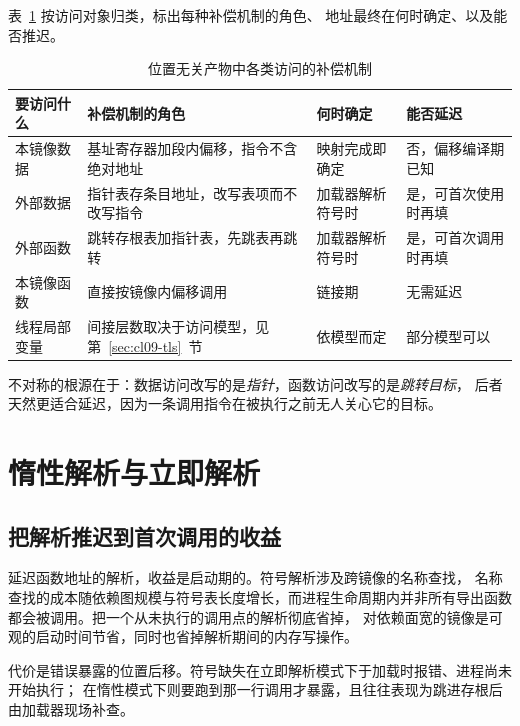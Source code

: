\documentclass[12pt,a4paper,fontset=fandol]{ctexbook}
\begin{document}
表~\ref{tab:cl09-trampoline} 按访问对象归类，标出每种补偿机制的角色、
地址最终在何时确定、以及能否推迟。

\begin{table}
  \centering
  \caption{位置无关产物中各类访问的补偿机制}
  \label{tab:cl09-trampoline}
  \begin{tabular}{>{\raggedright\arraybackslash}p{} >{\raggedright\arraybackslash}p{} >{\raggedright\arraybackslash}p{} >{\raggedright\arraybackslash}p{}}
    \toprule
    要访问什么 & 补偿机制的角色 & 何时确定 & 能否延迟 \\
    \midrule
    本镜像数据 & 基址寄存器加段内偏移，指令不含绝对地址 & 映射完成即确定 & 否，偏移编译期已知 \\
    外部数据 & 指针表存条目地址，改写表项而不改写指令 & 加载器解析符号时 & 是，可首次使用时再填 \\
    外部函数 & 跳转存根表加指针表，先跳表再跳转 & 加载器解析符号时 & 是，可首次调用时再填 \\
    本镜像函数 & 直接按镜像内偏移调用 & 链接期 & 无需延迟 \\
    线程局部变量 & 间接层数取决于访问模型，见第~\ref{sec:cl09-tls}~节 & 依模型而定 & 部分模型可以 \\
    \bottomrule
  \end{tabular}
\end{table}

不对称的根源在于：数据访问改写的是\emph{指针}，函数访问改写的是\emph{跳转目标}，
后者天然更适合延迟，因为一条调用指令在被执行之前无人关心它的目标。

\section{惰性解析与立即解析}\label{sec:cl09-lazy}

\subsection{把解析推迟到首次调用的收益}

延迟函数地址的解析，收益是启动期的。符号解析涉及跨镜像的名称查找，
名称查找的成本随依赖图规模与符号表长度增长，而进程生命周期内并非所有导出函数
都会被调用。把一个从未执行的调用点的解析彻底省掉，
对依赖面宽的镜像是可观的启动时间节省，同时也省掉解析期间的内存写操作。

代价是错误暴露的位置后移。符号缺失在立即解析模式下于加载时报错、进程尚未开始执行；
在惰性模式下则要跑到那一行调用才暴露，且往往表现为跳进存根后由加载器现场补查。
\end{document}
